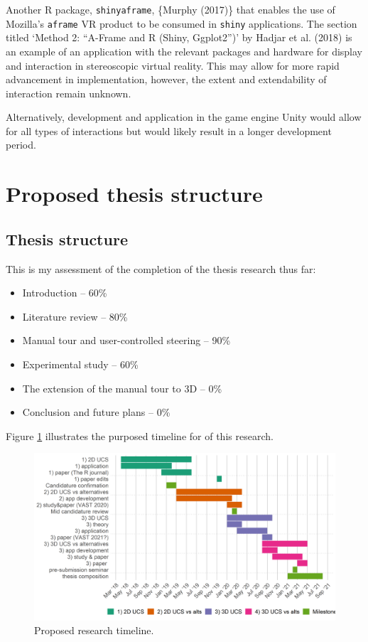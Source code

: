\documentclass[11,]{article}
\providecommand{\tightlist}{%
  \setlength{\itemsep}{0pt}\setlength{\parskip}{0pt}}
\begin{document}
Another R package, \texttt{shinyaframe}, \{Murphy (2017)\} that enables the use of Mozilla's \texttt{aframe} VR product to be consumed in \texttt{shiny} applications. The section titled `Method 2: ``A-Frame and R (Shiny, Ggplot2'')' by Hadjar et al. (2018) is an example of an application with the relevant packages and hardware for display and interaction in stereoscopic virtual reality. This may allow for more rapid advancement in implementation, however, the extent and extendability of interaction remain unknown.

Alternatively, development and application in the game engine Unity would allow for all types of interactions but would likely result in a longer development period.

\hypertarget{proposed-thesis-structure}{%
\section{Proposed thesis structure}\label{proposed-thesis-structure}}

\hypertarget{thesis-structure}{%
\subsection{Thesis structure}\label{thesis-structure}}

This is my assessment of the completion of the thesis research thus far:

\begin{itemize}
\tightlist
\item
  Introduction -- 60\%
\item
  Literature review -- 80\%
\item
  Manual tour and user-controlled steering -- 90\%
\item
  Experimental study -- 60\%
\item
  The extension of the manual tour to 3D -- 0\%
\item
  Conclusion and future plans -- 0\%
\end{itemize}

Figure \ref{fig:timeline} illustrates the purposed timeline for of this research.

\begin{figure}[h]

{\centering \includegraphics[width=1\linewidth,]{figures/phd_timeline} 

}

\caption{Proposed research timeline.}\label{fig:timeline}
\end{figure}
\end{document}

